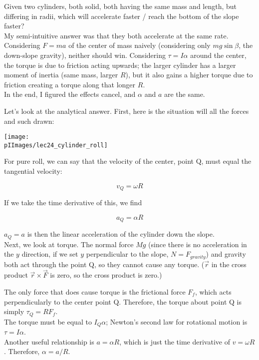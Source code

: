 Given two cylinders, both solid, both having the same mass and length, but differing in radii, which will accelerate faster / reach the bottom of the slope faster?\\
My semi-intuitive answer was that they both accelerate at the same rate. Considering $F = ma$ of the center of mass naively (considering only $m g \sin \beta$, the down-slope gravity), neither should win. Considering $\tau = I \alpha$ around the center, the torque is due to friction acting upwards; the larger cylinder has a larger moment of inertia (same mass, larger $R$), but it also gains a higher torque due to friction creating a torque along that longer $R$.\\
In the end, I figured the effects cancel, and $\alpha$ and $a$ are the same.

Let's look at the analytical answer. First, here is the situation will all the forces and such drawn:

\begin{center}
\texttt{[image: \\pIImages/lec24\_cylinder\_roll]}
\end{center}

For pure roll, we can say that the velocity of the center, point Q, must equal the tangential velocity:

\begin{equation}
v_Q = \omega R
\end{equation}

If we take the time derivative of this, we find

\begin{equation}
a_Q = \alpha R
\end{equation}

$a_Q = a$ is then the linear acceleration of the cylinder down the slope.\\
Next, we look at torque. The normal force $M g$ (since there is no acceleration in the $y$ direction, if we set $y$ perpendicular to the slope, $N = F_{gravity}$) and gravity both act through the point Q, so they cannot cause any torque. ($\vec{r}$ in the cross product $\vec{r} \times \vec{F}$ is zero, so the cross product is zero.)

The only force that does cause torque is the frictional force $F_f$, which acts perpendicularly to the center point Q. Therefore, the torque about point Q is simply $\tau_Q = R F_f$.\\
The torque must be equal to $I_Q \alpha$; Newton's second law for rotational motion is $\tau = I \alpha$.\\
Another useful relationship is $a = \alpha R$, which is just the time derivative of $v = \omega R$. Therefore, $\alpha = a/R$.

